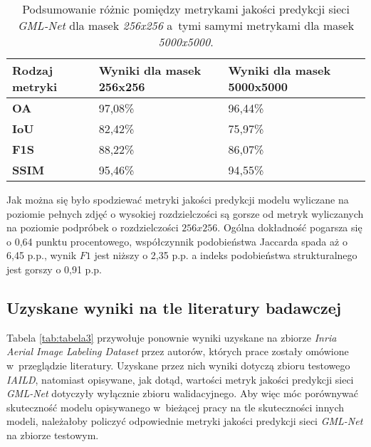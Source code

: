 \begin{table}[!h]
\centering
\begin{tabular}{|M{3cm}|M{5.5cm}|M{5.5cm}|}
\hline
{}
\textbf{Rodzaj metryki} & \textbf{Wyniki dla masek 256x256} & \textbf{Wyniki dla masek 5000x5000} \\ 
 \hline 
\textbf{OA} & 97,08\% & 96,44\% \\
 \hline 
\textbf{IoU} & 82,42\% & 75,97\% \\
 \hline 
\textbf{F1S} & 88,22\% & 86,07\% \\
 \hline 
\textbf{SSIM} & 95,46\% & 94,55\% \\
 \hline 
\end{tabular}
\caption{Podsumowanie różnic pomiędzy metrykami jakości predykcji sieci \textit{GML-Net} dla masek \emph{256x256} a~tymi samymi metrykami dla masek \emph{5000x5000}.}
\label{tab:tabela2}
\end{table}

Jak można się było spodziewać metryki jakości predykcji modelu wyliczane na poziomie pełnych zdjęć o wysokiej rozdzielczości są gorsze od metryk wyliczanych na poziomie podpróbek o rozdzielczości $\textit{256x256}$. Ogólna dokładność pogarsza się o 0,64 punktu procentowego, współczynnik podobieństwa Jaccarda spada aż o 6,45 p.p., wynik $\textit{F1}$ jest niższy o 2,35 p.p. a indeks podobieństwa strukturalnego jest gorszy o 0,91 p.p. 

\subsection{Uzyskane wyniki na tle literatury badawczej}

Tabela \ref{tab:tabela3} przywołuje ponownie wyniki uzyskane na zbiorze \textit{Inria Aerial Image Labeling Dataset} przez autorów, których prace zostały omówione w~przeglądzie literatury. Uzyskane przez nich wyniki dotyczą zbioru testowego \emph{IAILD}, natomiast opisywane, jak dotąd, wartości metryk jakości predykcji sieci \textit{GML-Net} dotyczyły wyłącznie zbioru walidacyjnego. Aby więc móc porównywać skuteczność modelu opisywanego w~bieżącej pracy na tle skuteczności innych modeli, należałoby policzyć odpowiednie metryki jakości predykcji sieci \textit{GML-Net} na zbiorze testowym.

